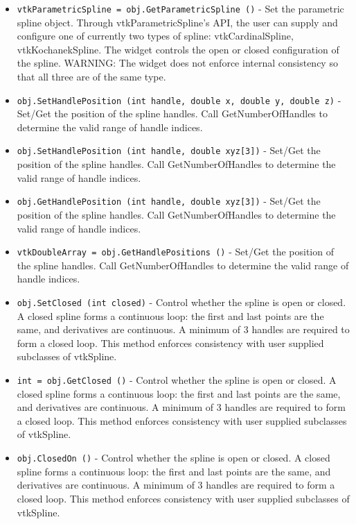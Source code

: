 \begin{itemize}
\item  \verb|vtkParametricSpline = obj.GetParametricSpline ()| -  Set the parametric spline object. Through vtkParametricSpline's API, the
 user can supply and configure one of currently two types of spline:
 vtkCardinalSpline, vtkKochanekSpline. The widget controls the open
 or closed configuration of the spline.
 WARNING: The widget does not enforce internal consistency so that all
 three are of the same type.

\item  \verb|obj.SetHandlePosition (int handle, double x, double y, double z)| -  Set/Get the position of the spline handles. Call GetNumberOfHandles
 to determine the valid range of handle indices.

\item  \verb|obj.SetHandlePosition (int handle, double xyz[3])| -  Set/Get the position of the spline handles. Call GetNumberOfHandles
 to determine the valid range of handle indices.

\item  \verb|obj.GetHandlePosition (int handle, double xyz[3])| -  Set/Get the position of the spline handles. Call GetNumberOfHandles
 to determine the valid range of handle indices.

\item  \verb|vtkDoubleArray = obj.GetHandlePositions ()| -  Set/Get the position of the spline handles. Call GetNumberOfHandles
 to determine the valid range of handle indices.

\item  \verb|obj.SetClosed (int closed)| -  Control whether the spline is open or closed. A closed spline forms
 a continuous loop: the first and last points are the same, and
 derivatives are continuous.  A minimum of 3 handles are required to
 form a closed loop.  This method enforces consistency with
 user supplied subclasses of vtkSpline.

\item  \verb|int = obj.GetClosed ()| -  Control whether the spline is open or closed. A closed spline forms
 a continuous loop: the first and last points are the same, and
 derivatives are continuous.  A minimum of 3 handles are required to
 form a closed loop.  This method enforces consistency with
 user supplied subclasses of vtkSpline.

\item  \verb|obj.ClosedOn ()| -  Control whether the spline is open or closed. A closed spline forms
 a continuous loop: the first and last points are the same, and
 derivatives are continuous.  A minimum of 3 handles are required to
 form a closed loop.  This method enforces consistency with
 user supplied subclasses of vtkSpline.


\end{itemize}
